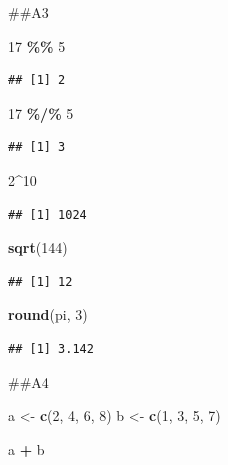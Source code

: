 \documentclass[
]{article}
\newenvironment{Shaded}{\begin{snugshade}}{\end{snugshade}}
\newcommand{\DecValTok}[1]{\textcolor[rgb]{0.00,0.00,0.81}{#1}}
\newcommand{\FunctionTok}[1]{\textcolor[rgb]{0.13,0.29,0.53}{\textbf{#1}}}
\newcommand{\NormalTok}[1]{#1}
\newcommand{\OtherTok}[1]{\textcolor[rgb]{0.56,0.35,0.01}{#1}}
\newcommand{\SpecialCharTok}[1]{\textcolor[rgb]{0.81,0.36,0.00}{\textbf{#1}}}
\begin{document}
\#\#A3

\begin{Shaded}
\begin{Highlighting}[]
\DecValTok{17} \SpecialCharTok{\%\%} \DecValTok{5}
\end{Highlighting}
\end{Shaded}

\begin{verbatim}
## [1] 2
\end{verbatim}

\begin{Shaded}
\begin{Highlighting}[]
\DecValTok{17} \SpecialCharTok{\%/\%} \DecValTok{5}
\end{Highlighting}
\end{Shaded}

\begin{verbatim}
## [1] 3
\end{verbatim}

\begin{Shaded}
\begin{Highlighting}[]
\DecValTok{2}\SpecialCharTok{\^{}}\DecValTok{10}
\end{Highlighting}
\end{Shaded}

\begin{verbatim}
## [1] 1024
\end{verbatim}

\begin{Shaded}
\begin{Highlighting}[]
\FunctionTok{sqrt}\NormalTok{(}\DecValTok{144}\NormalTok{)}
\end{Highlighting}
\end{Shaded}

\begin{verbatim}
## [1] 12
\end{verbatim}

\begin{Shaded}
\begin{Highlighting}[]
\FunctionTok{round}\NormalTok{(pi, }\DecValTok{3}\NormalTok{)}
\end{Highlighting}
\end{Shaded}

\begin{verbatim}
## [1] 3.142
\end{verbatim}

\#\#A4

\begin{Shaded}
\begin{Highlighting}[]
\NormalTok{a }\OtherTok{\textless{}{-}} \FunctionTok{c}\NormalTok{(}\DecValTok{2}\NormalTok{, }\DecValTok{4}\NormalTok{, }\DecValTok{6}\NormalTok{, }\DecValTok{8}\NormalTok{)}
\NormalTok{b }\OtherTok{\textless{}{-}} \FunctionTok{c}\NormalTok{(}\DecValTok{1}\NormalTok{, }\DecValTok{3}\NormalTok{, }\DecValTok{5}\NormalTok{, }\DecValTok{7}\NormalTok{)}

\NormalTok{a }\SpecialCharTok{+}\NormalTok{ b}
\end{Highlighting}
\end{Shaded}
\end{document}
